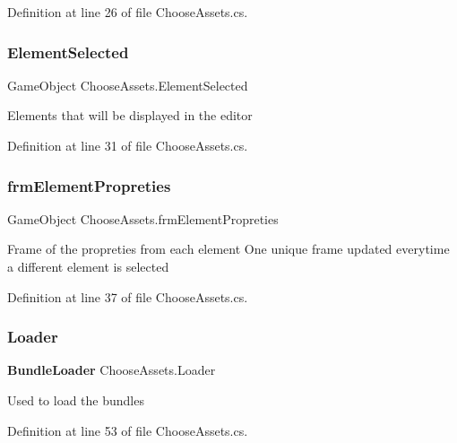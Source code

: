 Definition at line 26 of file Choose\+Assets.\+cs.

\mbox{\label{class_choose_assets_ac3db163e05f17b5a8745c02ee1c004cd}} 
\subsubsection{Element\+Selected}
{\footnotesize\ttfamily Game\+Object Choose\+Assets.\+Element\+Selected}



Elements that will be displayed in the editor 



Definition at line 31 of file Choose\+Assets.\+cs.

\mbox{\label{class_choose_assets_acb74e129636a259f54c09c045ef21bd1}} 
\subsubsection{frm\+Element\+Propreties}
{\footnotesize\ttfamily Game\+Object Choose\+Assets.\+frm\+Element\+Propreties}



Frame of the propreties from each element One unique frame updated everytime a different element is selected 



Definition at line 37 of file Choose\+Assets.\+cs.

\mbox{\label{class_choose_assets_a4b6f32724c1e732d16c03c55b1cbd331}} 
\subsubsection{Loader}
{\footnotesize\ttfamily \textbf{ Bundle\+Loader} Choose\+Assets.\+Loader}



Used to load the bundles 



Definition at line 53 of file Choose\+Assets.\+cs.

\mbox{\label{class_choose_assets_a51e0823ea63f0ee70f6f5c29f82a0f63}} 

